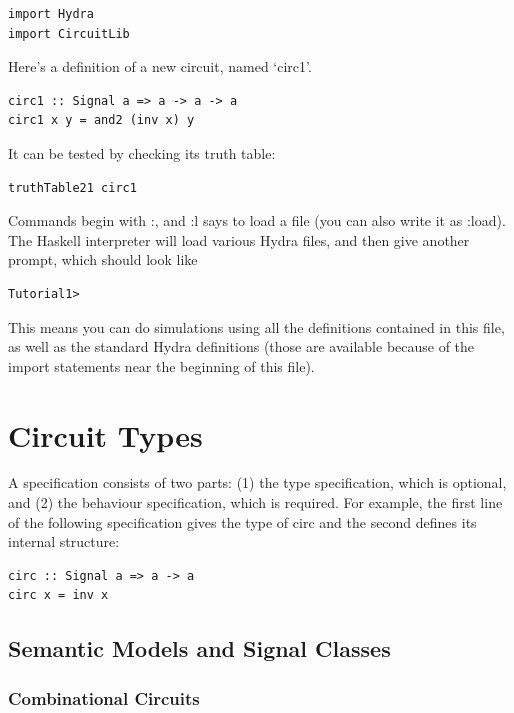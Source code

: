 \documentclass[a4paper,openany,fleqn]{book}
\begin{document}
\begin{verbatim}
import Hydra
import CircuitLib
\end{verbatim}

Here's a definition of a new circuit, named `circ1'.

\begin{verbatim}
circ1 :: Signal a => a -> a -> a
circ1 x y = and2 (inv x) y
\end{verbatim}

It can be tested by checking its truth table:

\begin{verbatim}
truthTable21 circ1
\end{verbatim}

Commands begin with :, and :l says to load a file (you can also write
it as :load).  The Haskell interpreter will load various Hydra files,
and then give another prompt, which should look like

\begin{verbatim}
Tutorial1> 
\end{verbatim}

This means you can do simulations using all the definitions contained
in this file, as well as the standard Hydra definitions (those are
available because of the import statements near the beginning of this
file).

\chapter{Circuit Types}
\label{sec:circuit-types}

A specification consists of two parts: (1) the type specification,
which is optional, and (2) the behaviour specification, which is
required.  For example, the first line of the following specification
gives the type of circ and the second defines its internal structure:
\begin{verbatim}
circ :: Signal a => a -> a
circ x = inv x
\end{verbatim}

\section{Semantic Models and Signal Classes}
\label{sec:models-classes}

\subsection{Combinational Circuits}
\label{sec:combinational-circuits}
\end{document}
